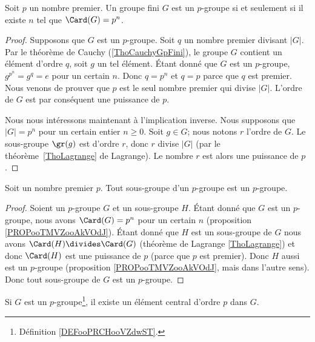 \begin{proposition}		\label{PROPooTMVZooAkVOdJ}
	Soit \( p\) un nombre premier. Un groupe fini \( G\) est un \( p\)-groupe si et seulement si il existe \( n\) tel que \( \Card(G)=p^n\).
\end{proposition}

\begin{proof}
	Supposons que \( G\) est un \( p\)-groupe. Soit \( q\) un nombre premier divisant \( | G |\). Par le théorème de Cauchy (\ref{ThoCauchyGpFini}), le groupe \( G\) contient un élément d'ordre \( q\), soit \( g\) un tel élément. Étant donné que \( G\) est un \( p\)-groupe, \( g^{p^n}=g^q=e\) pour un certain \( n\). Donc \( q=p^n\) et \( q=p\) parce que \( q\) est premier. Nous venons de prouver que \( p\) est le seul nombre premier qui divise \( | G |\). L'ordre de \( G\) est par conséquent une puissance de \( p\).

	Nous nous intéressons maintenant à l'implication inverse. Nous supposons que \( | G |=p^n\) pour un certain entier \( n\geq 0\). Soit \( g\in G\); nous notons \( r\) l'ordre de \( G\). Le sous-groupe \( \gr(g)\) est d'ordre \( r\), donc \( r\) divise \( | G |\) (par le théorème~\ref{ThoLagrange} de Lagrange). Le nombre \( r\) est alors une puissance de \( p\).
\end{proof}



\begin{proposition}	\label{PROPooXKXRooYBMfIs}
	Soit un nombre premier \( p\). Tout sous-groupe d'un \( p\)-groupe est un \( p\)-groupe.
\end{proposition}

\begin{proof}
	Soient un \( p\)-groupe \( G\) et un sous-groupe \( H\). Étant donné que \( G\) est un \( p\)-groupe, nous avons \( \Card(G)=p^n\) pour un certain \( n\) (proposition \ref{PROPooTMVZooAkVOdJ}). Étant donné que \( H\) est un sous-groupe de \( G\) nous avons \( \Card(H)\divides\Card(G)\) (théorème de Lagrange \ref{ThoLagrange}) et donc \( \Card(H)\) est une puissance de \( p\) (parce que \( p\) est premier). Donc \( H\) aussi est un \( p\)-groupe (proposition \ref{PROPooTMVZooAkVOdJ}, mais dans l'autre sens). Donc tout sous-groupe de \( G\) est un \( p\)-groupe.
\end{proof}


\begin{proposition}	\label{PROPooWCHTooQCHUjF}
	Si \( G\) est un \( p\)-groupe\footnote{Définition \ref{DEFooPRCHooVZdwST}.}, il existe un élément central d'ordre \( p\) dans \( G\).
\end{proposition}

